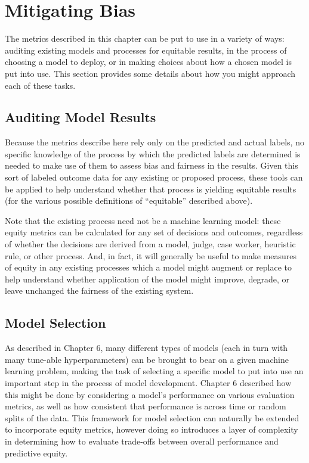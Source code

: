 \documentclass[]{krantz}
\begin{document}
\hypertarget{sec:applications}{\section{Mitigating
Bias}\label{sec:applications}}

The metrics described in this chapter can be put to use in a variety of
ways: auditing existing models and processes for equitable results, in
the process of choosing a model to deploy, or in making choices about
how a chosen model is put into use. This section provides some details
about how you might approach each of these tasks.

\subsection{Auditing Model Results}\label{auditing-model-results}

Because the metrics describe here rely only on the predicted and actual
labels, no specific knowledge of the process by which the predicted
labels are determined is needed to make use of them to assess bias and
fairness in the results. Given this sort of labeled outcome data for any
existing or proposed process, these tools can be applied to help
understand whether that process is yielding equitable results (for the
various possible definitions of ``equitable'' described above).

Note that the existing process need not be a machine learning model:
these equity metrics can be calculated for any set of decisions and
outcomes, regardless of whether the decisions are derived from a model,
judge, case worker, heuristic rule, or other process. And, in fact, it
will generally be useful to make measures of equity in any existing
processes which a model might augment or replace to help understand
whether application of the model might improve, degrade, or leave
unchanged the fairness of the existing system.

\subsection{Model Selection}\label{model-selection}

As described in Chapter 6, many different types of models (each in turn
with many tune-able hyperparameters) can be brought to bear on a given
machine learning problem, making the task of selecting a specific model
to put into use an important step in the process of model development.
Chapter 6 described how this might be done by considering a model's
performance on various evaluation metrics, as well as how consistent
that performance is across time or random splits of the data. This
framework for model selection can naturally be extended to incorporate
equity metrics, however doing so introduces a layer of complexity in
determining how to evaluate trade-offs between overall performance and
predictive equity.
\end{document}
